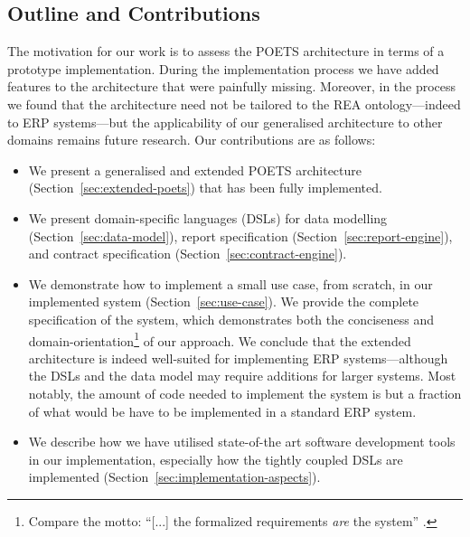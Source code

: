 \subsection{Outline and Contributions}
The motivation for our work is to assess the POETS architecture in
terms of a prototype implementation. During the implementation process
we have added 
features to the architecture that were painfully missing. Moreover, in
the process we found that the architecture need not be tailored to the
REA ontology---indeed to ERP systems---but the applicability of our
generalised architecture to other domains remains future research.
Our contributions are as follows:
\begin{itemize}
\item We present a generalised and extended POETS architecture
  (Section~\ref{sec:extended-poets}) that has been fully
  implemented.
\item We present domain-specific languages (DSLs) for data modelling
  (Section~\ref{sec:data-model}), report specification
  (Section~\ref{sec:report-engine}), and contract specification
  (Section~\ref{sec:contract-engine}).
\item We demonstrate how to implement a small use case, from scratch,
  in our implemented system (Section~\ref{sec:use-case}). We provide
  the complete specification of the system, which demonstrates both
  the conciseness and domain-orientation\footnote{Compare the motto:
    ``[...] the formalized requirements \emph{are} the system''
    \cite[page 382]{henglein09jlap}.} of our approach. We conclude that
  the extended architecture is indeed well-suited for implementing ERP
  systems---although the DSLs and the data model may require
  additions for larger systems. Most notably, the amount of code
  needed to implement the system is but a fraction of what would be
  have to be implemented in a standard ERP system.
\item We describe how we have utilised state-of-the art software
  development tools in our implementation, especially how the tightly
  coupled DSLs are implemented
  (Section~\ref{sec:implementation-aspects}).
\end{itemize}

